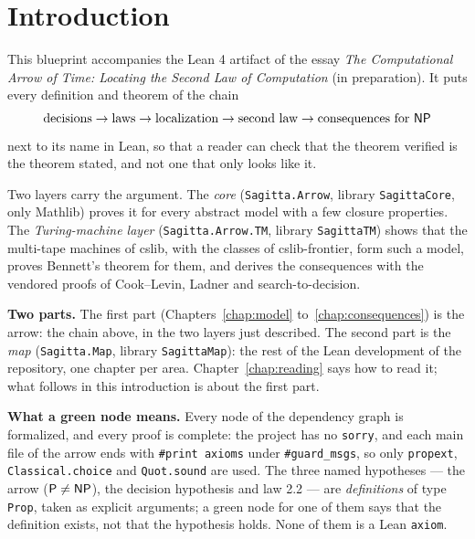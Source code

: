 %

\chapter*{Introduction}

This blueprint accompanies the Lean 4 artifact of the essay \emph{The Computational Arrow of Time:
Locating the Second Law of Computation} (in preparation). It puts every definition and theorem of the
chain
\[
  \text{decisions} \to \text{laws} \to \text{localization} \to \text{second law} \to
  \text{consequences for } \mathsf{NP}
\]
next to its name in Lean, so that a reader can check that the theorem verified is the theorem
stated, and not one that only looks like it.

Two layers carry the argument. The \emph{core} (\texttt{Sagitta.Arrow}, library
\texttt{SagittaCore}, only Mathlib) proves it for every abstract model with a few closure
properties. The \emph{Turing-machine layer} (\texttt{Sagitta.Arrow.TM}, library
\texttt{SagittaTM}) shows that the multi-tape machines of cslib, with the classes of
cslib-frontier, form such a model, proves Bennett's theorem for them, and derives the
consequences with the vendored proofs of Cook--Levin, Ladner and search-to-decision.

\textbf{Two parts.} The first part (Chapters~\ref{chap:model} to~\ref{chap:consequences}) is the
arrow: the chain above, in the two layers just described. The second part is the \emph{map}
(\texttt{Sagitta.Map}, library \texttt{SagittaMap}): the rest of the Lean development of the
repository, one chapter per area. Chapter~\ref{chap:reading} says how to read it; what follows in
this introduction is about the first part.

\textbf{What a green node means.} Every node of the dependency graph is formalized, and every proof
is complete: the project has no \texttt{sorry}, and each main file of the arrow ends with
\texttt{\#print axioms} under \texttt{\#guard\_msgs}, so only \texttt{propext},
\texttt{Classical.choice} and \texttt{Quot.sound} are used. The three named hypotheses --- the
arrow ($\mathsf{P} \neq \mathsf{NP}$), the decision hypothesis and law 2.2 --- are \emph{definitions} of type
\texttt{Prop}, taken as explicit arguments; a green node for one of them says that the definition
exists, not that the hypothesis holds. None of them is a Lean \texttt{axiom}.

